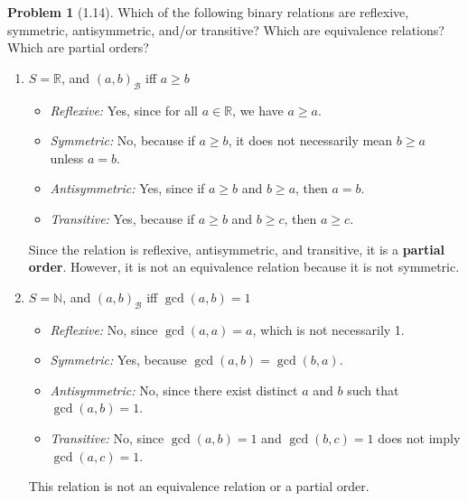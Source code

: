 \documentclass[12pt]{article}
\theoremstyle{definition}
\newtheorem{problem}{Problem}
\begin{document}
\begin{problem}[1.14]

    Which of the following binary relations are reflexive, symmetric, antisymmetric, and/or transitive?
    Which are equivalence relations? Which are partial orders?
    
    \begin{enumerate}[label=(\alph*)]
        
        \item $S = \mathbb{R}$, and $(a, b)_{\mathcal{B}}$ iff $a \geq b$
        \begin{solution}
            \begin{itemize}
                \item \textit{Reflexive:} Yes, since for all $a \in \mathbb{R}$, we have $a \geq a$.
                \item \textit{Symmetric:} No, because if $a \geq b$, it does not necessarily mean $b \geq a$ unless $a = b$.
                \item \textit{Antisymmetric:} Yes, since if $a \geq b$ and $b \geq a$, then $a = b$.
                \item \textit{Transitive:} Yes, because if $a \geq b$ and $b \geq c$, then $a \geq c$.
            \end{itemize}
            Since the relation is reflexive, antisymmetric, and transitive, it is a \textbf{partial order}. However, it is not an equivalence relation because it is not symmetric.
        \end{solution}
        
        \item $S = \mathbb{N}$, and $(a, b)_\mathcal{B}$ iff $\gcd(a, b) = 1$
        \begin{solution}
            \begin{itemize}
                \item \textit{Reflexive:} No, since $\gcd(a, a) = a$, which is not necessarily 1.
                \item \textit{Symmetric:} Yes, because $\gcd(a, b) = \gcd(b, a)$.
                \item \textit{Antisymmetric:} No, since there exist distinct $a$ and $b$ such that $\gcd(a, b) = 1$.
                \item \textit{Transitive:} No, since $\gcd(a, b) = 1$ and $\gcd(b, c) = 1$ does not imply $\gcd(a, c) = 1$.
            \end{itemize}
            This relation is not an equivalence relation or a partial order.
        \end{solution}
        

\end{enumerate}
\end{problem}
\end{document}
